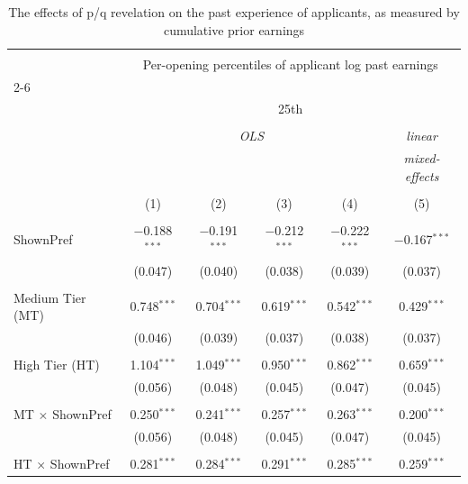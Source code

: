 
\begin{table}[!htbp] \centering 
  \caption{The effects of p/q revelation on the past experience of applicants, as measured by cumulative prior earnings} 
  \label{tab:past_earnings_percentiles} 
\begin{tabular}{@{\extracolsep{5pt}}lccccc} 
\\[-1.8ex]\hline 
\hline \\[-1.8ex] 
 & \multicolumn{5}{c}{Per-opening percentiles of applicant log past earnings} \\ 
\cline{2-6} 
\\[-1.8ex] & \multicolumn{5}{c}{25th} \\ 
\\[-1.8ex] & \multicolumn{4}{c}{\textit{OLS}} & \textit{linear} \\ 
 & \multicolumn{4}{c}{\textit{}} & \textit{mixed-effects} \\ 
\\[-1.8ex] & (1) & (2) & (3) & (4) & (5)\\ 
\hline \\[-1.8ex] 
 ShownPref & $-$0.188$^{***}$ & $-$0.191$^{***}$ & $-$0.212$^{***}$ & $-$0.222$^{***}$ & $-$0.167$^{***}$ \\ 
  & (0.047) & (0.040) & (0.038) & (0.039) & (0.037) \\ 
  & & & & & \\ 
 Medium Tier (MT) & 0.748$^{***}$ & 0.704$^{***}$ & 0.619$^{***}$ & 0.542$^{***}$ & 0.429$^{***}$ \\ 
  & (0.046) & (0.039) & (0.037) & (0.038) & (0.037) \\ 
  & & & & & \\ 
 High Tier (HT) & 1.104$^{***}$ & 1.049$^{***}$ & 0.950$^{***}$ & 0.862$^{***}$ & 0.659$^{***}$ \\ 
  & (0.056) & (0.048) & (0.045) & (0.047) & (0.045) \\ 
  & & & & & \\ 
 MT $\times$ ShownPref & 0.250$^{***}$ & 0.241$^{***}$ & 0.257$^{***}$ & 0.263$^{***}$ & 0.200$^{***}$ \\ 
  & (0.056) & (0.048) & (0.045) & (0.047) & (0.045) \\ 
  & & & & & \\ 
 HT $\times$ ShownPref & 0.281$^{***}$ & 0.284$^{***}$ & 0.291$^{***}$ & 0.285$^{***}$ & 0.259$^{***}$ \\ 

\end{tabular}
\end{table}
